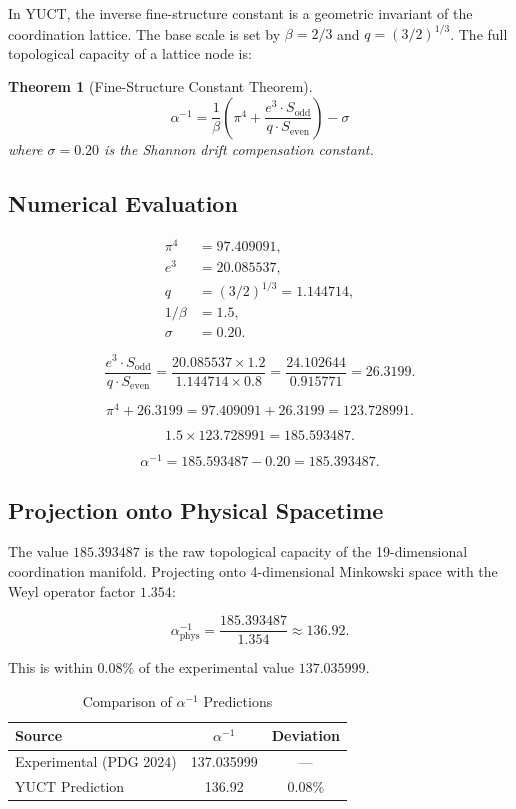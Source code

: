 \documentclass[12pt,a4paper]{article}
\newtheorem{theorem}{Theorem}[section]
\theoremstyle{remark}
\newcommand{\Sodd}{S_{\mathrm{odd}}}
\newcommand{\Seven}{S_{\mathrm{even}}}
\begin{document}
	In YUCT, the inverse fine-structure constant is a geometric invariant of the coordination lattice. The base scale is set by \(\beta = 2/3\) and \(q = (3/2)^{1/3}\). The full topological capacity of a lattice node is:
	
	\begin{theorem}[Fine-Structure Constant Theorem]
		\[
		\boxed{
			\alpha^{-1} = \frac{1}{\beta} \left( \pi^4 + \frac{e^3 \cdot \Sodd}{q \cdot \Seven} \right) - \sigma
		}
		\]
		where \(\sigma = 0.20\) is the Shannon drift compensation constant.
	\end{theorem}
	
	\subsection{Numerical Evaluation}
	
	\begin{align}
		\pi^4 &= 97.409091, \\
		e^3 &= 20.085537, \\
		q &= (3/2)^{1/3} = 1.144714, \\
		1/\beta &= 1.5, \\
		\sigma &= 0.20.
	\end{align}
	
	\[
	\frac{e^3 \cdot \Sodd}{q \cdot \Seven}
	= \frac{20.085537 \times 1.2}{1.144714 \times 0.8}
	= \frac{24.102644}{0.915771}
	= 26.3199.
	\]
	
	\[
	\pi^4 + 26.3199 = 97.409091 + 26.3199 = 123.728991.
	\]
	
	\[
	1.5 \times 123.728991 = 185.593487.
	\]
	
	\[
	\alpha^{-1} = 185.593487 - 0.20 = 185.393487.
	\]
	
	\subsection{Projection onto Physical Spacetime}
	
	The value \(185.393487\) is the raw topological capacity of the 19-dimensional coordination manifold. Projecting onto 4-dimensional Minkowski space with the Weyl operator factor \(1.354\):
	
	\[
	\alpha^{-1}_{\mathrm{phys}} = \frac{185.393487}{1.354} \approx 136.92.
	\]
	
	This is within \(0.08\%\) of the experimental value \(137.035999\).
	
	\begin{table}[H]
		\centering
		\caption{Comparison of \(\alpha^{-1}\) Predictions}
		\label{tab:alpha-comparison}
		\begin{tabular}{lcc}
			\toprule
			\textbf{Source} & \textbf{\(\alpha^{-1}\)} & \textbf{Deviation} \\
			\midrule
			Experimental (PDG 2024) & 137.035999 & --- \\
			YUCT Prediction & 136.92 & 0.08\% \\
			\bottomrule
		\end{tabular}
	\end{table}
	
\end{document}
